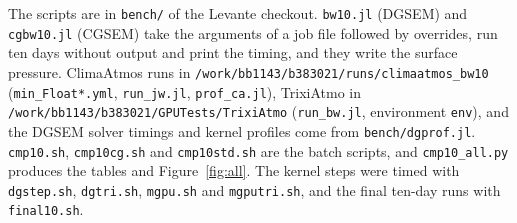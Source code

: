 \documentclass[11pt,a4paper]{article}
\newcommand{\code}[1]{\texttt{#1}}
\begin{document}
The scripts are in \code{bench/} of the Levante checkout. \code{bw10.jl}
(DGSEM) and \code{cgbw10.jl} (CGSEM) take the arguments of a job file
followed by overrides, run ten days without output and print the timing,
and they write the surface pressure. ClimaAtmos runs in
\code{/work/bb1143/b383021/runs/climaatmos\_bw10} (\code{min\_Float*.yml},
\code{run\_jw.jl}, \code{prof\_ca.jl}), TrixiAtmo in
\code{/work/bb1143/b383021/GPUTests/TrixiAtmo} (\code{run\_bw.jl},
environment \code{env}), and the DGSEM solver timings and kernel profiles
come from \code{bench/dgprof.jl}. \code{cmp10.sh}, \code{cmp10cg.sh} and
\code{cmp10std.sh} are the batch scripts, and \code{cmp10\_all.py} produces
the tables and Figure~\ref{fig:all}. The kernel steps were timed with
\code{dgstep.sh}, \code{dgtri.sh}, \code{mgpu.sh} and \code{mgputri.sh},
and the final ten-day runs with \code{final10.sh}.
\end{document}
